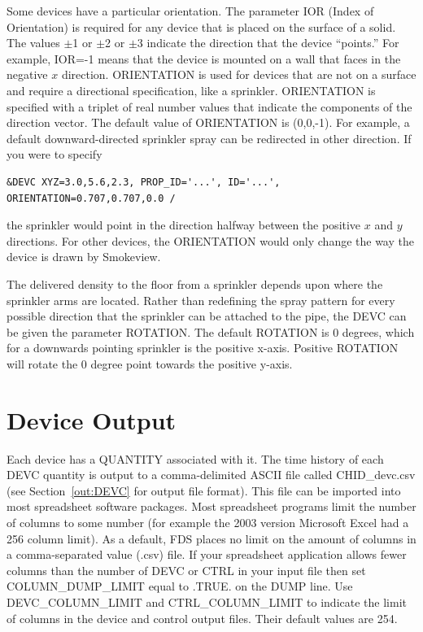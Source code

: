 \documentclass[11pt]{book}
\begin{document}
Some devices have a particular orientation. The parameter {\ct IOR} (Index of Orientation) is required for any device that is placed on the surface of a solid. The values $\pm$1 or $\pm$2 or $\pm$3 indicate the direction that the device ``points.'' For example, {\ct IOR=-1} means that the device is mounted on a wall that faces in the negative $x$ direction. {\ct ORIENTATION} is used for devices that are not on a surface and require a directional specification, like a sprinkler. {\ct ORIENTATION} is specified with a triplet of real number values that indicate the components of the direction vector. The default value of {\ct ORIENTATION} is (0,0,-1). For example, a default downward-directed sprinkler spray can be redirected in other direction.
If you were to specify
\begin{lstlisting}
&DEVC XYZ=3.0,5.6,2.3, PROP_ID='...', ID='...', ORIENTATION=0.707,0.707,0.0 /
\end{lstlisting}
the sprinkler would point in the direction halfway between the positive $x$ and $y$ directions. For other devices, the {\ct ORIENTATION} would only change the way the device is drawn by Smokeview.

The delivered density to the floor from a sprinkler depends upon where the sprinkler arms are located.  Rather than redefining the spray pattern for every possible direction that the sprinkler can be attached to the pipe, the {\ct DEVC} can be given the parameter {\ct ROTATION}.  The default {\ct ROTATION} is 0 degrees, which for a downwards pointing sprinkler is the positive x-axis.  Positive {\ct ROTATION} will rotate the 0 degree point towards the positive y-axis.

\section{Device Output}
\label{info:out:DEVC}

Each device has a {\ct QUANTITY} associated with it. The time history of each {\ct DEVC} quantity is output to a comma-delimited ASCII file called {\ct CHID\_devc.csv} (see Section~\ref{out:DEVC} for output file format). This file can be imported into most spreadsheet software packages.  Most spreadsheet programs limit the number of columns to some number (for example the 2003 version Microsoft Excel had a 256 column limit).  As a default, FDS places no limit on the amount of columns in a comma-separated value (.csv) file.  If your spreadsheet application allows fewer columns than the number of {\ct DEVC} or {\ct CTRL} in your input file then set {\ct COLUMN\_DUMP\_LIMIT} equal to {\ct .TRUE.} on the {\ct DUMP} line. Use {\ct DEVC\_COLUMN\_LIMIT} and {\ct CTRL\_COLUMN\_LIMIT} to indicate the limit of columns in the device and control output files. Their default values are 254.
\end{document}
